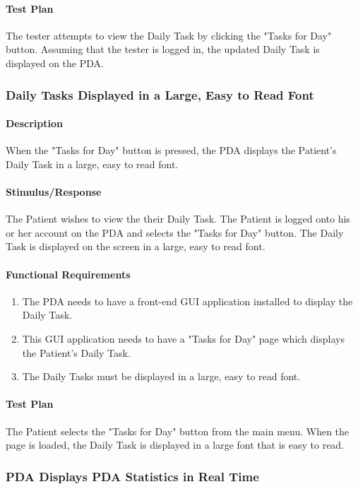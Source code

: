 \documentclass{article}
\begin{document}
\paragraph{Test Plan}
The tester attempts to view the Daily Task by clicking the "Tasks for Day" button. Assuming that the tester is logged in, the updated Daily Task is displayed on the PDA.

\subsubsection{Daily Tasks Displayed in a Large, Easy to Read Font}\label{sec: Large Font}

\paragraph{Description}
When the "Tasks for Day" button is pressed, the PDA displays the Patient's Daily Task in a large, easy to read font.

\paragraph{Stimulus/Response}
The Patient wishes to view the their Daily Task. The Patient is logged onto his or her account on the PDA and selects the "Tasks for Day" button. The Daily Task is displayed on the screen in a large, easy to read font.

\paragraph{Functional Requirements}
\begin{enumerate}
\item The PDA needs to have a front-end GUI application installed to display the Daily Task. 
\item This GUI application needs to have a "Tasks for Day" page which displays the Patient's Daily Task.
\item The Daily Tasks must be displayed in a large, easy to read font.
\end{enumerate}

\paragraph{Test Plan}
The Patient selects the "Tasks for Day" button from the main menu. When the page is loaded, the Daily Task is displayed in a large font that is easy to read.

\subsubsection{PDA Displays PDA Statistics in Real Time}\label{sec: PDA Displays Stats}
\end{document}

